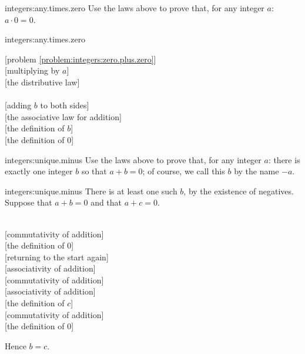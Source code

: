 \begin{problem}{integers:any.times.zero}
Use the laws above to prove that, for any integer \(a\): \(a \cdot 0=0\).
\end{problem}
\begin{answer}{integers:any.times.zero}
\begin{twocolumnproof}
[problem \ref{problem:integers:zero.plus.zero}] \\
[multiplying by \(a\)] \\
[the distributive law] \\
 \\
[adding \(b\) to both sides] \\
[the associative law for addition] \\
[the definition of \(b\)] \\
[the definition of \(0\)]
\end{twocolumnproof}
\end{answer}
\begin{problem}{integers:unique.minus}
Use the laws above to prove that, for any integer \(a\): there is exactly one integer \(b\) so that \(a+b=0\); of course, we call this \(b\) by the name \(-a\).
\end{problem}
\begin{answer}{integers:unique.minus}
There is at least one such \(b\), by the existence of negatives.
Suppose that \(a+b=0\) and that \(a+c=0\).
\begin{twocolumnproof}
 \\
[commutativity of addition] \\
[the definition of \(0\)] \\
[returning to the start again] \\
[associativity of addition] \\
[commutativity of addition] \\
[associativity of addition] \\
[the definition of \(c\)] \\
[commutativity of addition] \\
[the definition of \(0\)]
\end{twocolumnproof}
Hence \(b=c\).
\end{answer}
